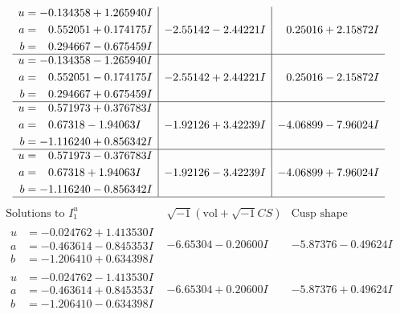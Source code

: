 \documentclass[1p]{elsarticle_modified}
\theoremstyle{definition}
\newcommand{\I}{\sqrt{-1}}
\begin{document}
$$\begin{array}{c|c|c}
\begin{aligned}
u &= -0.134358 + 1.265940 I \\
a &= \phantom{-}0.552051 + 0.174175 I \\
b &= \phantom{-}0.294667 - 0.675459 I\end{aligned}
 & -2.55142 - 2.44221 I & \phantom{-}0.25016 + 2.15872 I \\ \hline\begin{aligned}
u &= -0.134358 - 1.265940 I \\
a &= \phantom{-}0.552051 - 0.174175 I \\
b &= \phantom{-}0.294667 + 0.675459 I\end{aligned}
 & -2.55142 + 2.44221 I & \phantom{-}0.25016 - 2.15872 I \\ \hline\begin{aligned}
u &= \phantom{-}0.571973 + 0.376783 I \\
a &= \phantom{-}0.67318 - 1.94063 I \\
b &= -1.116240 + 0.856342 I\end{aligned}
 & -1.92126 + 3.42239 I & -4.06899 - 7.96024 I \\ \hline\begin{aligned}
u &= \phantom{-}0.571973 - 0.376783 I \\
a &= \phantom{-}0.67318 + 1.94063 I \\
b &= -1.116240 - 0.856342 I\end{aligned}
 & -1.92126 - 3.42239 I & -4.06899 + 7.96024 I\\
 \hline 
 \end{array}$$\newpage$$\begin{array}{c|c|c}  
\text{Solutions to }I^u_{1}& \I (\text{vol} + \sqrt{-1}CS) & \text{Cusp shape}\\
 \hline 
\begin{aligned}
u &= -0.024762 + 1.413530 I \\
a &= -0.463614 - 0.845353 I \\
b &= -1.206410 + 0.634398 I\end{aligned}
 & -6.65304 - 0.20600 I & -5.87376 - 0.49624 I \\ \hline\begin{aligned}
u &= -0.024762 - 1.413530 I \\
a &= -0.463614 + 0.845353 I \\
b &= -1.206410 - 0.634398 I\end{aligned}
 & -6.65304 + 0.20600 I & -5.87376 + 0.49624 I \\ \hline\begin{aligned}

\end{aligned}
\end{array}$$
\end{document}
